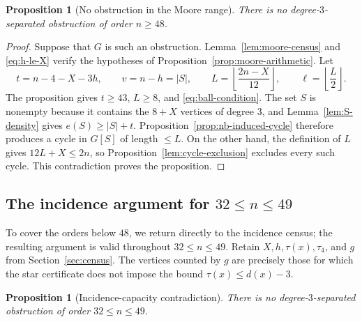 \documentclass[11pt]{article}
\numberwithin{equation}{section}
\newtheorem{proposition}[theorem]{Proposition}
\theoremstyle{definition}
\theoremstyle{remark}
\begin{document}
\begin{proposition}[No obstruction in the Moore range]
\label{prop:no-obstruction-ge48}
There is no degree-\(3\)-separated obstruction of order \(n\ge48\).
\end{proposition}

\begin{proof}
Suppose that \(G\) is such an obstruction.  Lemma~\ref{lem:moore-census}
and \eqref{eq:h-le-X} verify the hypotheses of
Proposition~\ref{prop:moore-arithmetic}.  Let
\[
  t=n-4-X-3h,\qquad
  v=n-h=|S|,\qquad
  L=\left\lfloor\frac{2n-X}{12}\right\rfloor,\qquad
  \ell=\left\lfloor\frac L2\right\rfloor.
\]
The proposition gives \(t\ge43\), \(L\ge8\), and
\eqref{eq:ball-condition}.  The set \(S\) is nonempty because it contains
the \(8+X\) vertices of degree \(3\), and Lemma~\ref{lem:S-density} gives
\(e(S)\ge|S|+t\).  Proposition~\ref{prop:nb-induced-cycle} therefore
produces a cycle in \(G[S]\) of length \(\le L\).  On the other hand, the
definition of \(L\) gives \(12L+X\le2n\), so
Proposition~\ref{lem:cycle-exclusion} excludes every such cycle.
This contradiction proves the proposition.
\end{proof}

\subsection{The incidence argument for
\texorpdfstring{\(32\le n\le49\)}{32 <= n <= 49}}

To cover the orders below \(48\), we return directly to the incidence census;
the resulting argument is valid throughout \(32\le n\le49\).  Retain
\(X,h,\tau(x),\tau_4\), and \(g\) from Section~\ref{sec:census}.  The vertices
counted by \(g\) are precisely those for which the star certificate does not
impose the bound \(\tau(x)\le d(x)-3\).

\begin{proposition}[Incidence-capacity contradiction]
\label{prop:incidence-capacity-contradiction}
There is no degree-\(3\)-separated obstruction of order
\(32\le n\le49\).
\end{proposition}
\end{document}
